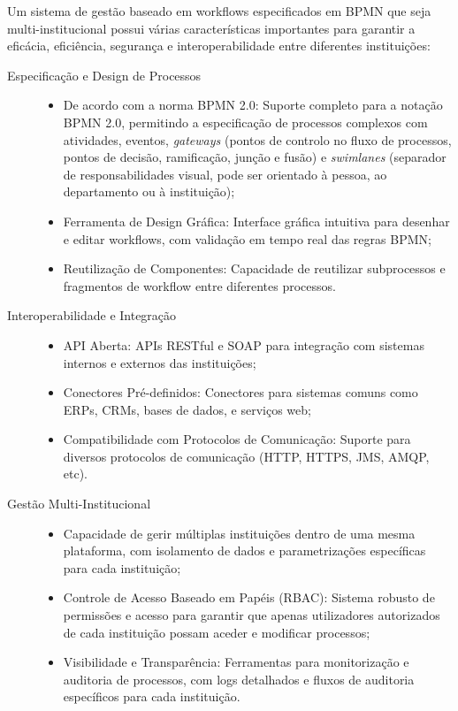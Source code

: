 Um sistema de gestão baseado em workflows especificados em BPMN que seja multi-institucional 
possui várias características importantes para garantir a eficácia, eficiência, segurança e 
interoperabilidade entre diferentes instituições:

\begin{description}
    \item[Especificação e Design de Processos] 
        \begin{itemize}
            \item De acordo com a norma BPMN 2.0: Suporte completo para a notação BPMN 2.0, permitindo a 
            especificação de processos complexos com atividades, eventos, \emph{gateways} (pontos de controlo no 
            fluxo de processos, pontos de decisão, ramificação, junção e fusão) e 
            \emph{swimlanes} (separador de responsabilidades visual, pode ser orientado à pessoa, 
            ao departamento ou à instituição);
            \item Ferramenta de Design Gráfica: Interface gráfica intuitiva para desenhar e editar 
            workflows, com validação em tempo real das regras BPMN;
            \item Reutilização de Componentes: Capacidade de reutilizar subprocessos e fragmentos 
            de workflow entre diferentes processos.
        \end{itemize}
    
    \item[Interoperabilidade e Integração] 
        \begin{itemize}
            \item API Aberta: APIs RESTful e SOAP para integração com sistemas internos e externos 
            das instituições;
            \item Conectores Pré-definidos: Conectores para sistemas comuns como ERPs, CRMs, 
            bases de dados, e serviços web;
            \item Compatibilidade com Protocolos de Comunicação: Suporte para diversos protocolos 
            de comunicação (HTTP, HTTPS, JMS, AMQP, etc).
        \end{itemize}

    \item[Gestão Multi-Institucional] 
        \begin{itemize}
            \item Capacidade de gerir múltiplas instituições dentro de uma mesma plataforma, 
            com isolamento de dados e parametrizações específicas para cada instituição;
            \item Controle de Acesso Baseado em Papéis (RBAC): Sistema robusto de permissões e 
            acesso para garantir que apenas utilizadores autorizados de cada instituição possam 
            aceder e modificar processos;
            \item Visibilidade e Transparência: Ferramentas para monitorização e auditoria de 
            processos, com logs detalhados e fluxos de auditoria específicos para cada instituição.
        \end{itemize}


\end{description}
